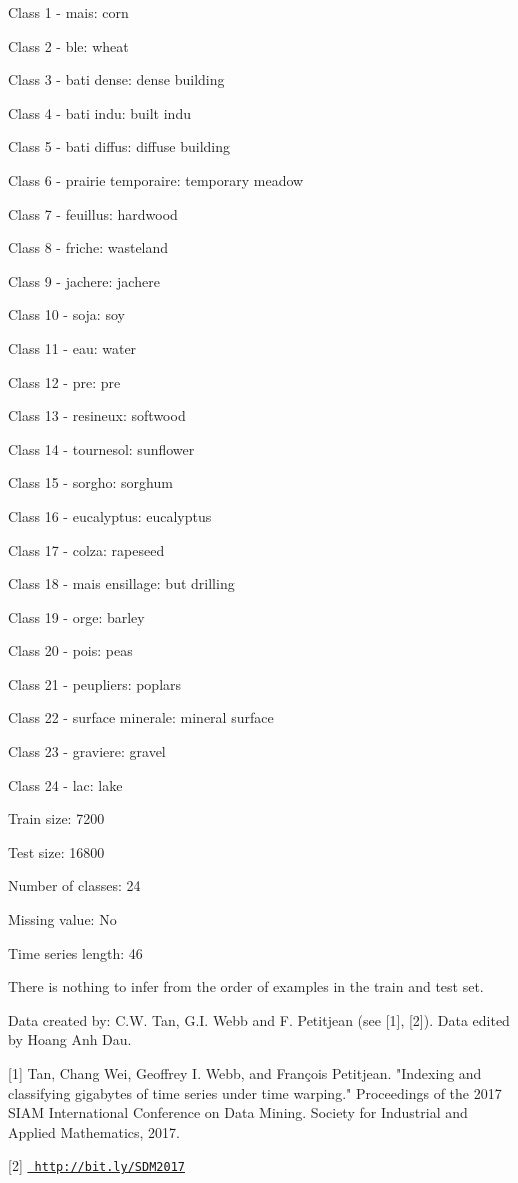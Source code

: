 \begin{DoxyItemize}
\item Class 1 -\/ mais\+: corn
\item Class 2 -\/ ble\+: wheat
\item Class 3 -\/ bati dense\+: dense building
\item Class 4 -\/ bati indu\+: built indu
\item Class 5 -\/ bati diffus\+: diffuse building
\item Class 6 -\/ prairie temporaire\+: temporary meadow
\item Class 7 -\/ feuillus\+: hardwood
\item Class 8 -\/ friche\+: wasteland
\item Class 9 -\/ jachere\+: jachere
\item Class 10 -\/ soja\+: soy
\item Class 11 -\/ eau\+: water
\item Class 12 -\/ pre\+: pre
\item Class 13 -\/ resineux\+: softwood
\item Class 14 -\/ tournesol\+: sunflower
\item Class 15 -\/ sorgho\+: sorghum
\item Class 16 -\/ eucalyptus\+: eucalyptus
\item Class 17 -\/ colza\+: rapeseed
\item Class 18 -\/ mais ensillage\+: but drilling
\item Class 19 -\/ orge\+: barley
\item Class 20 -\/ pois\+: peas
\item Class 21 -\/ peupliers\+: poplars
\item Class 22 -\/ surface minerale\+: mineral surface
\item Class 23 -\/ graviere\+: gravel
\item Class 24 -\/ lac\+: lake
\end{DoxyItemize}

Train size\+: 7200

Test size\+: 16800

Number of classes\+: 24

Missing value\+: No

Time series length\+: 46

There is nothing to infer from the order of examples in the train and test set.

Data created by\+: C.\+W. Tan, G.\+I. Webb and F. Petitjean (see \mbox{[}1\mbox{]}, \mbox{[}2\mbox{]}). Data edited by Hoang Anh Dau.

\mbox{[}1\mbox{]} Tan, Chang Wei, Geoffrey I. Webb, and François Petitjean. "{}\+Indexing and classifying gigabytes of time series under time warping."{} Proceedings of the 2017 SIAM International Conference on Data Mining. Society for Industrial and Applied Mathematics, 2017.

\mbox{[}2\mbox{]} \href{http://bit.ly/SDM2017}{\texttt{ http\+://bit.\+ly/\+SDM2017}} 
